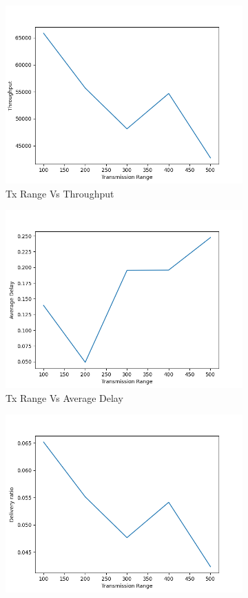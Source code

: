 \begin{figure}[h]
\begin{subfigure}{.5\textwidth}
  \centering
  \includegraphics[width=.8\linewidth]{_15_4_static/TransmissionRangevsThroughput.png}
     \caption{Tx Range Vs Throughput}
    \label{tx_range_throughput}    
\end{subfigure}
\begin{subfigure}{.5\textwidth}
  \centering
  \includegraphics[width=.8\linewidth]{_15_4_static/TransmissionRangevsAverageDelay.png}
    \caption{Tx Range Vs Average Delay}
     \label{tx_range_delay}
\end{subfigure}
\begin{subfigure}{.5\textwidth}
  \centering
  \includegraphics[width=.8\linewidth]{_15_4_static/TransmissionRangevsDeliveryRatio.png}

\end{subfigure}
\end{figure}
